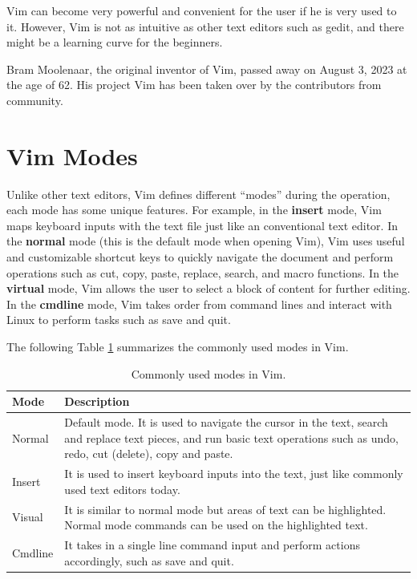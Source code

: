 Vim can become very powerful and convenient for the user if he is very used to it. However, Vim is not as intuitive as other text editors such as gedit, and there might be a learning curve for the beginners.

Bram Moolenaar, the original inventor of Vim, passed away on August 3, 2023 at the age of 62. His project Vim has been taken over by the contributors from community. 

\section{Vim Modes} \label{ch:tfe:subsec:vimgeneralintro}

Unlike other text editors, Vim defines different ``modes'' during the operation, each mode has some unique features. For example, in the \textbf{insert} mode, Vim maps keyboard inputs with the text file just like an conventional text editor. In the \textbf{normal} mode (this is the default mode when opening Vim), Vim uses useful and customizable shortcut keys to quickly navigate the document and perform operations such as cut, copy, paste, replace, search, and macro functions. In the \textbf{virtual} mode, Vim allows the user to select a block of content for further editing. In the \textbf{cmdline} mode, Vim takes order from command lines and interact with Linux to perform tasks such as save and quit.

The following Table \ref{ch:tfe:tab:vimmodes} summarizes the commonly used modes in Vim.
\begin{table}
  \centering \caption{Commonly used modes in Vim.}\label{ch:tfe:tab:vimmodes}
  \begin{tabularx}{\textwidth}{lX}
    \hline
    Mode & Description \\ \hline
    Normal & Default mode. It is used to navigate the cursor in the text, search and replace text pieces, and run basic text operations such as undo, redo, cut (delete), copy and paste. \\ 
    Insert & It is used to insert keyboard inputs into the text, just like commonly used text editors today. \\ 
    Visual & It is similar to normal mode but areas of text can be highlighted. Normal mode commands can be used on the highlighted text. \\ 
    Cmdline & It takes in a single line command input and perform actions accordingly, such as save and quit. \\
    \hline
  \end{tabularx}
\end{table}

